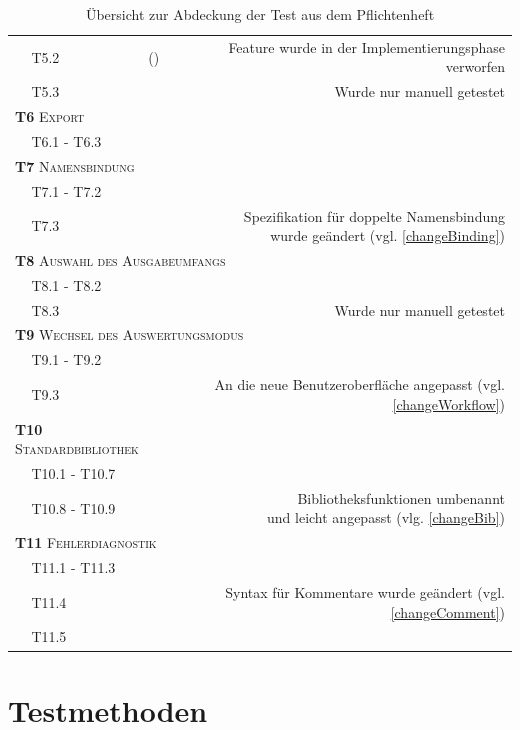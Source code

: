 \documentclass[parskip=full,11pt,openany]{scrreprt}
\newcommand{\cmark}{\ding{51}}%
\newcommand{\xmark}{\ding{55}}%
\begin{document}
\begin{table}[h]
\begin{tabular}{@{}ll|c|r@{}}
		&T5.2 & (\xmark) & Feature wurde in der Implementierungsphase verworfen\\
		&T5.3 & \xmark & Wurde nur manuell getestet \\ %
		\multicolumn{2}{l|}{\small \textsc{\textbf{T6} Export}} & &\\ 
		&T6.1 - T6.3 & \cmark & \\
		\multicolumn{3}{l|}{\small \textsc{\textbf{T7} Namensbindung}}\\ 
		&T7.1 - T7.2 & \cmark & \\
		&T7.3 & \cmark & \makecell[r]{Spezifikation für doppelte Namensbindung\\wurde geändert (vgl. \ref{changeBinding})} \\
		\multicolumn{4}{l}{\small \textsc{\textbf{T8} Auswahl des Ausgabeumfangs}}\\ 
		&T8.1 - T8.2 & \cmark & \\
		&T8.3 & \xmark & Wurde nur manuell getestet \\ %
		\multicolumn{4}{l}{\small \textsc{\textbf{T9} Wechsel des Auswertungsmodus}}\\ 
		&T9.1 - T9.2 & \cmark & \\
		&T9.3 & \cmark & An die neue Benutzeroberfläche angepasst  (vgl. \ref{changeWorkflow})\\
		\multicolumn{3}{l|}{\small \textsc{\textbf{T10} Standardbibliothek}}\\ 
		&T10.1 - T10.7 & \cmark & \\
		&T10.8 - T10.9 & \cmark & \makecell[r]{Bibliotheksfunktionen umbenannt\\und leicht angepasst (vlg. \ref{changeBib})} \\
		\multicolumn{3}{l|}{\small \textsc{\textbf{T11} Fehlerdiagnostik}}\\ 
		&T11.1 - T11.3 & \cmark & \\
		&T11.4 & \cmark & Syntax für Kommentare wurde geändert (vgl. \ref{changeComment}) \\
		&T11.5 & \cmark & \\
		\bottomrule
	\end{tabular}
	\caption{Übersicht zur Abdeckung der Test aus dem Pflichtenheft}
\end{table}


\chapter{Testmethoden}
\end{document}
